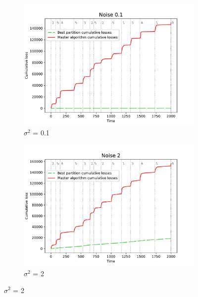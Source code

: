 \documentclass[12pt, twoside]{article}
\begin{document}
\begin{figure}[htb]
    \centering %
\begin{subfigure}{0.49\textwidth}
  \includegraphics[width=\linewidth]{dec_noise_0.1}
  \caption{$\sigma^2$ = 0.1}
  \label{fig:n_1}
\end{subfigure}\hfil %
\begin{subfigure}{0.49\textwidth}
  \includegraphics[width=\linewidth]{dec_noise_2}
  \caption{$\sigma^2$ = 2}
  \label{fig:n_2}
\end{subfigure}\hfil %


\end{figure}
\end{document}
